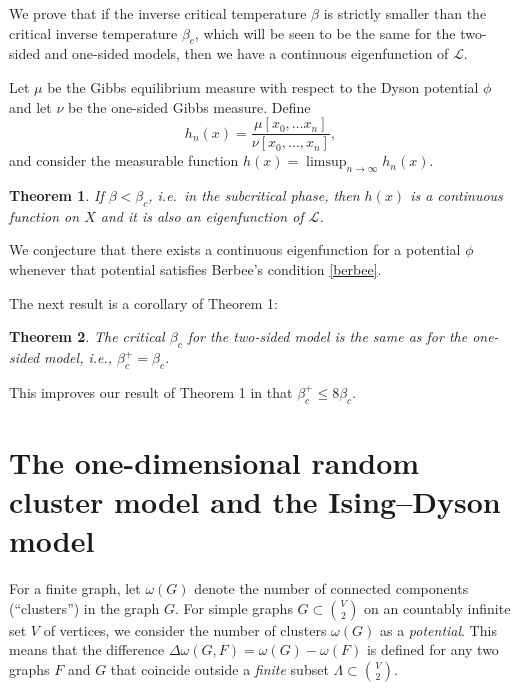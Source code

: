 \documentclass[11pt, a4paper]{amsart}
\newtheorem{thm}{Theorem}
\theoremstyle{definition}
\theoremstyle{remark}
\providecommand{\mc}{\mathcal}
\providecommand{\w}{\omega}
\def\X{X}
\begin{document}
We prove that if the inverse critical temperature $\beta$ is strictly smaller than
the critical inverse temperature $\beta_c$, which will be seen to be the same for
the two-sided and one-sided models, then we have a continuous eigenfunction of
$\mc{L}$.

Let $\mu$ be the Gibbs equilibrium measure with respect
to the Dyson potential $\phi$ and let $\nu$ be the one-sided Gibbs measure.
Define
$$
h_n(x)=\frac{\mu[x_0,\ldots x_n]}{\nu[x_0,\ldots, x_n]},
$$
and consider the measurable function $h(x)=\limsup_{n\to \infty}h_n(x)$. 

\begin{thm}\label{main} 
If $\beta<\beta_c$, i.e.\ in the subcritical phase,  
then $h(x)$ is a continuous function on $\X$ and it is also an 
eigenfunction of $\mc{L}$.
\end{thm}

We conjecture that there exists a continuous eigenfunction for a potential
$\phi$ whenever that potential satisfies Berbee's condition \eqref{berbee}.

The next result is a corollary of Theorem 1:

\begin{thm}
The critical $\beta_c$ for the two-sided model 
is the same as for the one-sided model, i.e., 
$\beta_c^+=\beta_c$.
\end{thm}

This improves our result of Theorem 1 in \cite{johob4}
that $\beta_c^+\leq 8\beta_c$.

\section{The one-dimensional random cluster model and the Ising--Dyson model}

For a finite graph, let $\w(G)$ denote the number of connected components
(``clusters'') in the graph $G$. For simple graphs $G\subset \binom V2$ on an
countably infinite set $V$ of vertices, we consider the number of clusters
$\w(G)$ as a \emph{potential}. This means that the difference
$\Delta\w(G,F) = \w(G)-\w(F)$ is defined for any two graphs $F$ and $G$ that
coincide outside a \emph{finite} subset $\Lambda\subset \binom V2$.
\end{document}
